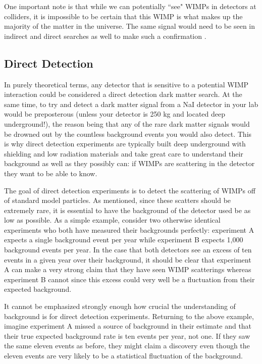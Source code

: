 One important note is that while we can potentially ``see" WIMPs in detectors at colliders,  it is impossible to be certain that this WIMP is what makes up the majority of the matter in the universe.  The same signal would need to be seen in indirect and direct searches as well to make such a confirmation \cite{queiroz2016dark}.


\subsection{Direct Detection}

In purely theoretical terms, any detector that is sensitive to a potential WIMP interaction could be considered a direct detection dark matter search.  At the same time, to try and detect a dark matter signal from a NaI detector in your lab would be preposterous (unless your detector is 250 kg and located deep underground!), the reason being that any of the rare dark matter signals would be drowned out by the countless background events you would also detect.  This is why direct detection experiments are typically built deep underground with shielding and low radiation materials and take great care to understand their background as well as they possibly can: if WIMPs are scattering in the detector they want to be able to know.

The goal of direct detection experiments is to detect the scattering of WIMPs off of standard model particles.  As mentioned, since these scatters should be extremely rare, it is essential to have the background of the detector used be as low as possible.  As a simple example, consider two otherwise identical experiments who both have measured their backgrounds perfectly: experiment A expects a single background event per year while experiment B expects 1,000 background events per year.  In the case that both detectors see an excess of ten events in a given year over their background, it should be clear that experiment A can make a very strong claim that they have seen WIMP scatterings whereas experiment B cannot since this excess could very well be a fluctuation from their expected background.

It cannot be emphasized strongly enough how crucial the understanding of background is for direct detection experiments.  Returning to the above example, imagine experiment A missed a source of background in their estimate and that their true expected background rate is ten events per year, not one.  If they saw the same eleven events as before, they might claim a discovery even though the eleven events are very likely to be a statistical fluctuation of the background.


